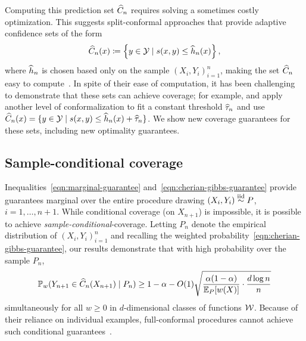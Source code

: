 \documentclass{article}
\newcommand{\scorefunc}{s}
\begin{document}
Computing
this prediction set $\widehat{C}_n$ requires solving a sometimes costly
optimization.
%
This suggests split-conformal approaches that provide adaptive
confidence sets of the form
\begin{equation*}
  \what{C}_n(x) \defeq \left\{y \in \mc{Y} \mid \scorefunc(x, y)
  \le \what{h}_n(x)\right\},
\end{equation*}
where $\widehat{h}_n$ is chosen based only on the sample $(X_i, Y_i)_{i =
  1}^n$, making the set $\widehat{C}_n$
easy to compute~\cite{RomanoPaCa19, CauchoisGuDu21}.
%
In spite of their ease of computation, it has been challenging to
demonstrate that these sets can achieve coverage;
for example, \citet{RomanoPaCa19} and \citet{CauchoisGuDu21}
apply another level of conformalization to
fit a constant threshold $\widehat{\tau}_n$ and use
$\what{C}_n(x) = \{y \in \mc{Y} \mid \scorefunc(x, y) \le
\what{h}_n(x) + \what{\tau}_n\}$.
%
%
We show new coverage guarantees for these sets, including new optimality
guarantees.

\subsection{Sample-conditional coverage}
\label{sec:intro-sample-conditional}

Inequalities~\eqref{eqn:marginal-guarantee}
and~\eqref{eqn:cherian-gibbs-guarantee} provide
guarantees marginal over the entire
procedure drawing $(X_i, Y_i) \stackrel{\rm iid}{\sim} P$, $i = 1, \ldots, n + 1$.
%
While conditional coverage (on $X_{n + 1}$) is
impossible, it is possible to achieve
\emph{sample-conditional}-coverage.
%
Letting $P_n$ denote the empirical distribution of $(X_i, Y_i)_{i =
  1}^n$
and
recalling the weighted probability~\eqref{eqn:cherian-gibbs-guarantee},
our results demonstrate that with high probability
over the sample $P_n$,
\begin{equation*}
  \mathbb{P}_w(Y_{n + 1} \in \widehat{C}_n(X_{n + 1}) \mid P_n) \ge
  1 - \alpha - O(1) \sqrt{\frac{\alpha(1 - \alpha)}{\mathbb{E}_P[w(X)]}
    \cdot \frac{d \log n}{n}}
\end{equation*}
simultaneously for all $w \ge 0$ in $d$-dimensional classes of functions
$\mathcal{W}$.
%
%
Because of their reliance on individual examples, full-conformal procedures
cannot achieve such conditional guarantees~\cite{BianBa22}.
\end{document}
